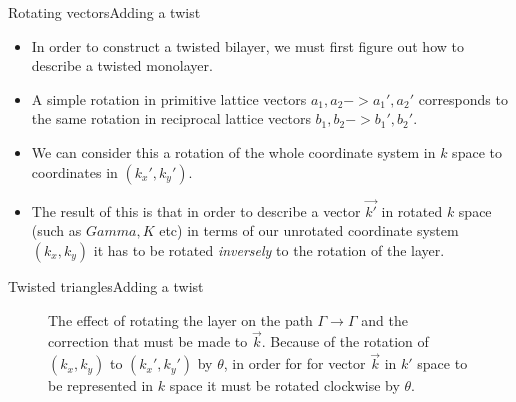 \documentclass[9pt]{beamer}
\begin{document}
\begin{frame}{Rotating vectors}{Adding a twist}
  \begin{itemize}
    \item In order to construct a twisted bilayer, we must first figure out how to describe a twisted monolayer.

    \item A simple rotation in primitive lattice vectors $a_1, a_2 -> a_1', a_2'$ corresponds to the same rotation in reciprocal lattice vectors $b_1, b_2 -> b_1', b_2'$.

    \item We can consider this a rotation of the whole coordinate system in $k$ space to coordinates in $(k_x', k_y')$.

    \item The result of this is that in order to describe a vector $\vec{k'}$ in rotated $k$ space (such as $Gamma, K$ etc) in terms of our unrotated coordinate system $(k_x, k_y)$ it has to be rotated \textit{inversely} to the rotation of the layer.
  \end{itemize}
\end{frame}

\begin{frame}{Twisted triangles}{Adding a twist}
  \begin{figure}
  \centering
    \caption{The effect of rotating the layer on the path $\Gamma \rightarrow \Gamma$ and the correction that must be made to $\vec{k}$. Because of the rotation of $(k_x, k_y)$ to $(k_x', k_y')$ by $\theta$, in order for for vector $\vec{k}$ in $k'$ space to be represented in $k$ space it must be rotated clockwise by $\theta$.}
  \end{figure}
\end{frame}
\end{document}
